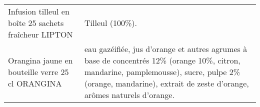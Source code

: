 \begin{longtable}{p{5cm}p{10cm}}
                                                    Infusion tilleul en boîte 25 sachets fraîcheur LIPTON &                                                                                                                                                                                                                                                                                                                                                                                                                                                                                                                                                                                                                                                                                                                                                                                                                                                                                                                                                                                                                          Tilleul (100\%). \\
                                                         Orangina jaune en bouteille verre 25 cl ORANGINA &                                                                                                                                                                                                                                                                                                                                                                                                                                                                                                                                                                                                                                                                                                                                                                                                                          eau gazéifiée, jus d'orange et autres agrumes à base de concentrés 12\% (orange 10\%, citron, mandarine, pamplemousse), sucre, pulpe 2\% (orange, mandarine), extrait de zeste d'orange, arômes naturels d'orange. \\

\end{longtable}
